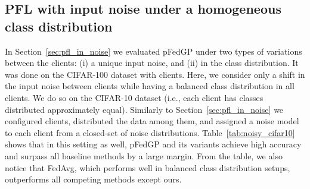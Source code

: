 \documentclass{article}
\def\Secref#1{Section~\ref{#1}}
\newcommand{\tblref}[1]{Table~\ref{#1}}
\begin{document}
\subsection{PFL with input noise under a homogeneous class distribution} \label{sec:in_noise_cifar10}
In \Secref{sec:pfl_in_noise} we evaluated pFedGP under two types of variations between the clients: (i) a unique input noise, and (ii) in the class distribution. It was done on the CIFAR-100 dataset with  clients. Here, we consider only a shift in the input noise between clients while having a balanced class distribution in all clients. We do so on the CIFAR-10 dataset (i.e., each client has  classes distributed approximately equal). Similarly to \Secref{sec:pfl_in_noise} we configured  clients, distributed the data among them, and assigned a noise model to each client from a closed-set of  noise distributions. \tblref{tab:noisy_cifar10} shows that in this setting as well, pFedGP and its variants achieve high accuracy and surpass all baseline methods by a large margin. From the table, we also notice that FedAvg, which performs well in balanced class distribution setups, outperforms all competing methods except ours.
\begin{table}[!t]
\setlength{\tabcolsep}{3pt}
\caption{pFedGP-IP-compute vs. pFedGP full model test accuracy and average predictive posterior inference run-time ( STD) as a function of the number of inducing points (IPs) over 50 clients on CINIC-10.
}
\vskip 0.15in
\centering
{}
\label{tab:num_inducing}
\end{table}
\end{document}

